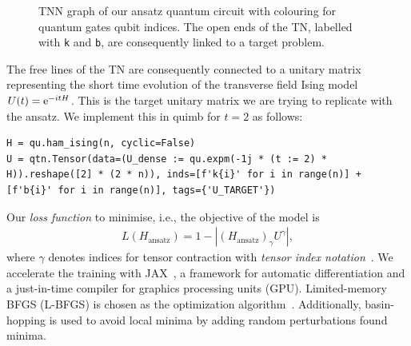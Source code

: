 \begin{figure}[tb]
    \centering
     \quad
    
    \caption{TNN graph of our ansatz quantum circuit with colouring for \protect{} quantum gates \protect{} qubit indices. The open ends of the TN, labelled with \texttt{k} and \texttt{b}, are consequently linked to a target problem.}
    \label{fig:TNN_circuit}
\end{figure}
The free lines of the TN are consequently connected to a unitary matrix representing the short time evolution of the transverse field Ising model $U(t) = \mathrm{e}^{-itH}$.
This is the target unitary matrix we are trying to replicate with the ansatz.
We implement this in quimb for $t=2$ as follows:
\begin{verbatim}
H = qu.ham_ising(n, cyclic=False)
U = qtn.Tensor(data=(U_dense := qu.expm(-1j * (t := 2) * H)).reshape([2] * (2 * n)), inds=[f'k{i}' for i in range(n)] + [f'b{i}' for i in range(n)], tags={'U_TARGET'})
\end{verbatim}

Our \emph{loss function} to minimise, i.e., the objective of the model is 
\begin{align}
    L(H_\text{ansatz}) = 1 - \left|\left(H_\text{ansatz}\right)_\gamma U^\gamma \right|
    ,
\end{align}
where $\gamma$ denotes indices for tensor contraction with \emph{tensor index notation}~\cite{Haghshenas2021}.
We accelerate the training with JAX~\cite{jax2018github}, a framework for automatic differentiation and a just-in-time compiler for graphics processing units (GPU). Limited-memory BFGS (L-BFGS) is chosen as the optimization algorithm~\cite{zhu1997algorithm}. Additionally, basin-hopping is used to avoid local minima by adding random perturbations found minima.



